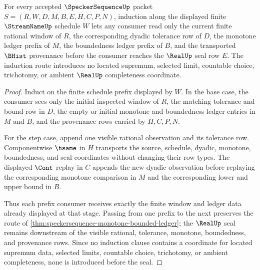\begin{theorem}
\label{thm:speckersequence-finite-stage-induction}
For every accepted $\SpeckerSequenceUp$ packet $S=(R,W,D,M,B,E,H,C,P,N)$, induction along the displayed finite $\StreamNameUp$ schedule $W$ lets any consumer read only the current finite rational window of $R$, the corresponding dyadic tolerance row of $D$, the monotone ledger prefix of $M$, the boundedness ledger prefix of $B$, and the transported $\BHist$ provenance before the consumer reaches the $\RealUp$ seal row $E$. The induction route introduces no located supremum, selected limit, countable choice, trichotomy, or ambient $\RealUp$ completeness coordinate.
\end{theorem}
\begin{proof}
Induct on the finite schedule prefix displayed by $W$. In the base case, the consumer sees only the initial inspected window of $R$, the matching tolerance and bound row in $D$, the empty or initial monotone and boundedness ledger entries in $M$ and $B$, and the provenance rows carried by $H,C,P,N$.

For the step case, append one visible rational observation and its tolerance row. Componentwise $\hsame$ in $H$ transports the source, schedule, dyadic, monotone, boundedness, and seal coordinates without changing their row types. The displayed $\Cont$ replay in $C$ appends the new dyadic observation before replaying the corresponding monotone comparison in $M$ and the corresponding lower and upper bound in $B$.

Thus each prefix consumer receives exactly the finite window and ledger data already displayed at that stage. Passing from one prefix to the next preserves the route of \autoref{thm:speckersequence-monotone-bounded-ledger}; the $\RealUp$ seal remains downstream of the visible rational, tolerance, monotone, boundedness, and provenance rows. Since no induction clause contains a coordinate for located supremum data, selected limits, countable choice, trichotomy, or ambient completeness, none is introduced before the seal.
\end{proof}

